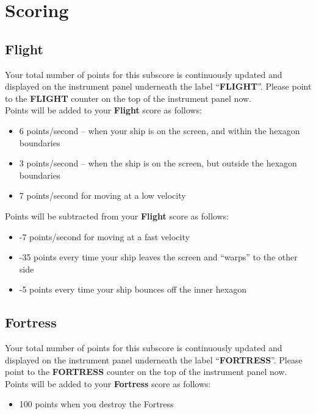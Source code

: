 \documentclass[letterpaper,12pt]{article}
\begin{document}
\section{Scoring}

\subsection{Flight}

Your total number of points for this subscore is continuously updated and displayed on
the instrument panel underneath the label ``\textbf{FLIGHT}''. Please point to the \textbf{FLIGHT}
counter on the top of the instrument panel now.\\

\noindent
Points will be added to your \textbf{Flight} score as follows:
\begin{itemize}
\item 6 points/second – when your ship is on the screen, and within the hexagon
boundaries
\item 3 points/second – when the ship is on the screen, but outside the hexagon
boundaries
\item 7 points/second for moving at a low velocity
\end{itemize}

\noindent
Points will be subtracted from your \textbf{Flight} score as follows:
\begin{itemize}
\item -7 points/second for moving at a fast velocity
\item -35 points every time your ship leaves the screen and ``warps'' to the other side
\item -5 points every time your ship bounces off the inner hexagon
\end{itemize}

\subsection{Fortress}

Your total number of points for this subscore is continuously updated and displayed on
the instrument panel underneath the label ``\textbf{FORTRESS}''. Please point to the
\textbf{FORTRESS} counter on the top of the instrument panel now.\\

\noindent
Points will be added to your \textbf{Fortress} score as follows:
\begin{itemize}
\item 100 points when you destroy the Fortress
\end{itemize}
\end{document}
